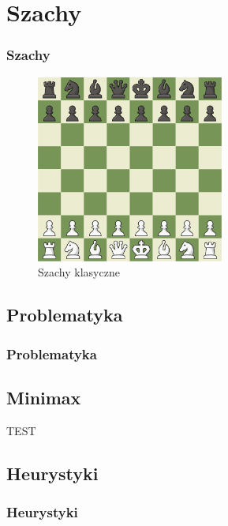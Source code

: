 \documentclass[polish,envcountsect,10pt]{beamer}
\begin{document}
    \section{Szachy}
        \begin{frame}
            \frametitle{Szachy}
            \begin{figure}[]
                \centering
                \includegraphics[width=0.55\textwidth]{images/chess.png}
                \caption{Szachy klasyczne}
            \end{figure}
        \end{frame}
        \subsection{Problematyka}
            \begin{frame}
               \frametitle{Problematyka} 
            \end{frame}
        \subsection{Minimax}
            \begin{frame}
                \begin{algorithm}[H]
                \caption{TEST}
                \end{algorithm}
            \end{frame}
        \subsection{Heurystyki}
            \begin{frame}
                \frametitle{Heurystyki}                
            \end{frame}
\end{document}
